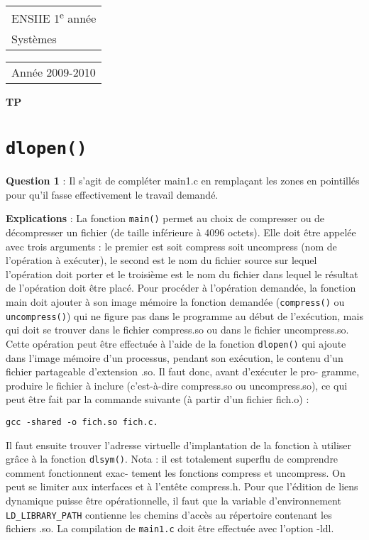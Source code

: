 \documentclass[a4paper,12pt]{article}
\begin{document}
{\large\sffamily
\begin{tabular}[t]{l}
  ENSIIE 1\textsuperscript{e} année\\
  Systèmes
\end{tabular}%
\hfill%
\begin{tabular}[t]{r}
  Année 2009-2010
\end{tabular}}

\vspace{2em}
\begin{center}
  \Large\bfseries\sffamily TP 
\end{center}
\vspace{1em}


\section{\texttt{dlopen()}}

\textbf{Question 1} : Il s'agit de compléter main1.c en remplaçant les zones en pointillés 
pour qu'il fasse effectivement le travail demandé.

\textbf{Explications} : La fonction \texttt{main()} permet au choix de compresser ou de
décompresser un fichier (de taille inférieure à 4096 octets).
Elle doit être appelée avec trois arguments : le premier est soit compress
soit uncompress (nom de l'opération à exécuter), le second est le nom du fichier
source sur lequel l'opération doit porter et le troisième est le nom du fichier
dans lequel le résultat de l'opération doit être placé.
Pour procéder à l'opération demandée, la fonction main doit ajouter à son
image mémoire la fonction demandée (\texttt{compress()} ou \texttt{uncompress()}) qui ne
figure pas dans le programme au début de l'exécution, mais qui doit se trouver
dans le fichier compress.so ou dans le fichier uncompress.so.
Cette opération peut être effectuée à l'aide de la fonction \texttt{dlopen()} qui
ajoute dans l'image mémoire d'un processus, pendant son exécution, le contenu
d'un fichier partageable d'extension .so. Il faut donc, avant d'exécuter le pro-
gramme, produire le fichier à inclure (c'est-à-dire compress.so ou uncompress.so),
ce qui peut être fait par la commande suivante (à partir d'un fichier fich.o) :
\begin{verbatim}
gcc -shared -o fich.so fich.c.
\end{verbatim}
Il faut ensuite trouver l'adresse virtuelle d'implantation de la fonction à
utiliser grâce à la fonction \texttt{dlsym()}.
Nota : il est totalement superflu de comprendre comment fonctionnent exac-
tement les fonctions compress et uncompress. On peut se limiter aux interfaces
et à l'entête compress.h.
Pour que l'édition de liens dynamique puisse être opérationnelle, il faut que
la variable d'environnement \verb#LD_LIBRARY_PATH# contienne les chemins d'accès
au répertoire contenant les fichiers .so. La compilation de \texttt{main1.c} doit être
effectuée avec l'option -ldl.
\end{document}
